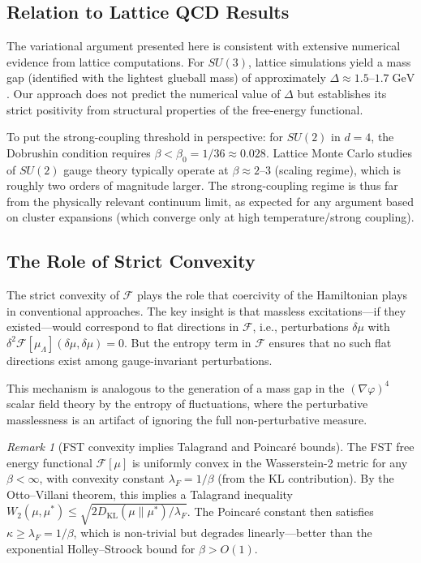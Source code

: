 \documentclass[12pt,a4paper]{article}
\theoremstyle{definition}
\theoremstyle{plain}
\theoremstyle{remark}
\newtheorem{remark}[definition]{Remark}
\begin{document}
\subsection{Relation to Lattice QCD Results}

The variational argument presented here is consistent with extensive numerical evidence from lattice computations. For $SU(3)$, lattice simulations yield a mass gap (identified with the lightest glueball mass) of approximately $\Delta \approx 1.5$--$1.7\;\mathrm{GeV}$ \cite{MorningstonPeardon1999, ChenXu2006}. Our approach does not predict the numerical value of $\Delta$ but establishes its strict positivity from structural properties of the free-energy functional.

To put the strong-coupling threshold in perspective: for $SU(2)$ in $d=4$, the Dobrushin condition requires $\beta < \beta_0 = 1/36 \approx 0.028$. Lattice Monte Carlo studies of $SU(2)$ gauge theory typically operate at $\beta \approx 2$--$3$ (scaling regime), which is roughly two orders of magnitude larger. The strong-coupling regime is thus far from the physically relevant continuum limit, as expected for any argument based on cluster expansions (which converge only at high temperature/strong coupling).

\subsection{The Role of Strict Convexity}

The strict convexity of $\mathcal{F}$ plays the role that coercivity of the Hamiltonian plays in conventional approaches. The key insight is that massless excitations---if they existed---would correspond to flat directions in $\mathcal{F}$, i.e., perturbations $\delta\mu$ with $\delta^2 \mathcal{F}[\mu_\Lambda](\delta\mu, \delta\mu) = 0$. But the entropy term in $\mathcal{F}$ ensures that no such flat directions exist among gauge-invariant perturbations.

This mechanism is analogous to the generation of a mass gap in the $(\nabla\varphi)^4$ scalar field theory by the entropy of fluctuations, where the perturbative masslessness is an artifact of ignoring the full non-perturbative measure.

\begin{remark}[FST convexity implies Talagrand and Poincar\'e bounds]
\label{rem:fst-convexity-talagrand}
The FST free energy functional $\mathcal{F}[\mu]$ is uniformly convex in the Wasserstein-2 metric for any $\beta < \infty$, with convexity constant $\lambda_F = 1/\beta$ (from the KL contribution). By the Otto--Villani theorem, this implies a Talagrand inequality $W_2(\mu, \mu^*) \leq \sqrt{2 D_{\mathrm{KL}}(\mu \| \mu^*) / \lambda_F}$. The Poincar\'e constant then satisfies $\kappa \geq \lambda_F = 1/\beta$, which is non-trivial but degrades linearly---better than the exponential Holley--Stroock bound for $\beta > O(1)$.
\end{remark}
\end{document}
